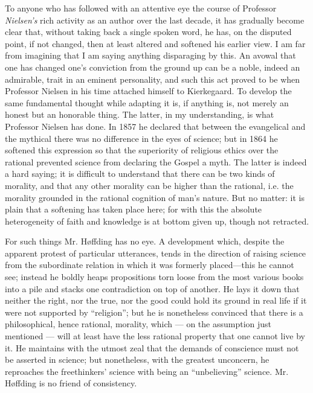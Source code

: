 \documentclass[12pt,a4paper,openany]{book}
\newcommand{\opage}[1]{\marginnote{\footnotesize\textit{[#1]}}}
\begin{document}
To anyone who has followed with an attentive eye the course of
Professor \emph{Nielsen's} rich activity as an author over the last decade,
it has gradually become clear that, without taking back a single
\opage{15}spoken word, he has, on the disputed point, if not changed, then at
least altered and softened his earlier view. I am far from imagining
that I am saying anything disparaging by this. An avowal that one has
changed one's conviction from the ground up can be a noble, indeed an
admirable, trait in an eminent personality, and such this act proved
to be when Professor Nielsen in his time attached himself to
Kierkegaard. To develop the same fundamental thought while adapting it
is, if anything is, not merely an honest but an honorable
thing. The latter, in my understanding, is what Professor Nielsen has done.
In 1857 he declared that between the evangelical and the mythical
there was no difference in the eyes of science; but in 1864 he softened
this expression so that the superiority of religious ethics over the
rational prevented science from declaring the Gospel
a myth. The latter is indeed a hard saying; it is difficult
to understand that there can be two kinds of morality, and that
any other morality can be higher than the rational, i.e. the
morality grounded in the rational cognition of man's nature. But no
matter: it is plain that a softening has taken place here; for with this
the absolute heterogeneity of faith and knowledge is at bottom given
up, though not retracted.

For such things Mr. Høffding has no eye. A development which,
despite the apparent protest of particular utterances, tends in the
direction of raising science from the subordinate relation in which it
was formerly placed---this he cannot see; instead he boldly heaps
propositions torn loose from the most various books into a pile and
stacks one contradiction on top of another. He lays it down that neither
the right, nor the true, nor the good could hold its ground in real life
if it were not supported by ``religion''; but he is nonetheless
convinced that there is a philosophical, hence rational, morality,
which --- on the assumption just mentioned --- will at least have the less
rational property that one cannot live by it. He maintains with the
utmost zeal that the demands of conscience must not be asserted in
science; but nonetheless, with the greatest unconcern, he reproaches the
freethinkers' science with being an ``unbelieving'' science. Mr. Høffding
is no friend of consistency.
\end{document}
